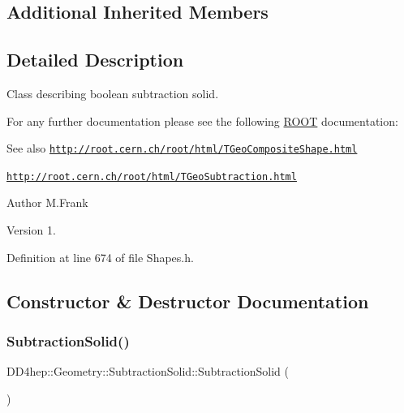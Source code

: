 \subsection*{Additional Inherited Members}


\subsection{Detailed Description}
Class describing boolean subtraction solid. 

For any further documentation please see the following \hyperlink{namespace_r_o_o_t}{R\+O\+OT} documentation\+: \begin{DoxySeeAlso}{See also}
\href{http://root.cern.ch/root/html/TGeoCompositeShape.html}{\tt http\+://root.\+cern.\+ch/root/html/\+T\+Geo\+Composite\+Shape.\+html} 

\href{http://root.cern.ch/root/html/TGeoSubtraction.html}{\tt http\+://root.\+cern.\+ch/root/html/\+T\+Geo\+Subtraction.\+html}
\end{DoxySeeAlso}
\begin{DoxyAuthor}{Author}
M.\+Frank 
\end{DoxyAuthor}
\begin{DoxyVersion}{Version}
1. 
\end{DoxyVersion}


Definition at line 674 of file Shapes.\+h.



\subsection{Constructor \& Destructor Documentation}
\hypertarget{class_d_d4hep_1_1_geometry_1_1_subtraction_solid_ac47559bc94cc05e908547ff2a603d3fd}{}\label{class_d_d4hep_1_1_geometry_1_1_subtraction_solid_ac47559bc94cc05e908547ff2a603d3fd} 
\subsubsection{\texorpdfstring{Subtraction\+Solid()}{SubtractionSolid()}\hspace{0.1cm}{\footnotesize\ttfamily [1/8]}}
{\footnotesize\ttfamily D\+D4hep\+::\+Geometry\+::\+Subtraction\+Solid\+::\+Subtraction\+Solid (\begin{DoxyParamCaption}{ }\end{DoxyParamCaption})\hspace{0.3cm}{\ttfamily [default]}}



